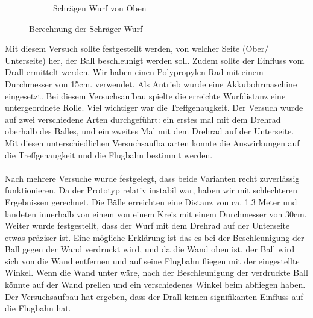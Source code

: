 \begin{figure}[h!]
\begin{subfigure}{.4\textwidth}
		\caption{Schrägen Wurf von Oben}
		\label{fig:Drehrad}
	\end{subfigure}
	\caption{Berechnung der Schräger Wurf}
	\label{Drehrad Versuch}
\end{figure}
Mit diesem Versuch sollte festgestellt werden, von welcher Seite (Ober/ Unterseite) her, der Ball beschleunigt werden soll. Zudem sollte der Einfluss vom Drall ermittelt werden. Wir haben einen Polypropylen Rad mit einem Durchmesser von 15cm. verwendet. Als Antrieb wurde eine Akkubohrmaschine eingesetzt. Bei diesem Versuchsaufbau spielte die erreichte Wurfdistanz eine untergeordnete Rolle. Viel wichtiger war die Treffgenaugkeit.  
Der Versuch wurde auf zwei verschiedene Arten durchgeführt: ein erstes mal mit dem Drehrad oberhalb des Balles, und ein zweites Mal mit dem Drehrad auf der Unterseite. Mit diesen unterschiedlichen Versuchsaufbauarten konnte die Auswirkungen auf die Treffgenaugkeit und die Flugbahn bestimmt werden.\\ \\
Nach mehrere Versuche wurde festgelegt, dass beide Varianten recht zuverlässig funktionieren. Da der Prototyp relativ instabil war, haben wir mit schlechteren Ergebnissen gerechnet. Die Bälle erreichten eine Distanz von ca. 1.3 Meter und landeten innerhalb von einem von einem Kreis mit einem Durchmesser von 30cm. 
\\Weiter wurde festgestellt, dass der Wurf mit dem Drehrad auf der Unterseite etwas präziser ist. Eine mögliche Erklärung ist das es bei der Beschleunigung der Ball gegen der Wand verdruckt wird, und da die Wand oben ist, der Ball wird sich von die Wand entfernen und auf seine Flugbahn fliegen mit der eingestellte Winkel. Wenn die Wand unter wäre, nach der Beschleunigung der verdruckte Ball könnte auf der Wand prellen und ein verschiedenes Winkel beim abfliegen haben. Der Versuchsaufbau hat ergeben, dass der Drall keinen signifikanten Einfluss auf die Flugbahn hat.\\

